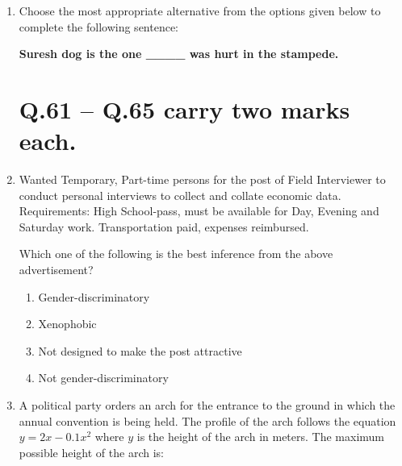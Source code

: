\documentclass[journal]{IEEEtran}
\numberwithin{equation}{enumi}
\numberwithin{figure}{enumi}
\begin{document}
\begin{enumerate}
\item Choose the most appropriate alternative from the options given below to complete the following sentence:  

\textbf{Suresh dog is the one \_\_\_\_ was hurt in the stampede.}  
\begin{enumerate}
\end{enumerate}

\section*{Q.61 -- Q.65 carry two marks each.}

\item Wanted Temporary, Part-time persons for the post of Field Interviewer to conduct personal interviews to collect and collate economic data. Requirements: High School-pass, must be available for Day, Evening and Saturday work. Transportation paid, expenses reimbursed.  

Which one of the following is the best inference from the above advertisement?  

\begin{enumerate}
   \item Gender-discriminatory 
   \item Xenophobic
   \item Not designed to make the post attractive
   \item Not gender-discriminatory
\end{enumerate}

\item A political party orders an arch for the entrance to the ground in which the annual convention is being held. The profile of the arch follows the equation 
$ y = 2x - 0.1x^2 $
where $y$ is the height of the arch in meters. The maximum possible height of the arch is:  
\begin{enumerate}
\end{enumerate}


\end{enumerate}
\end{document}
